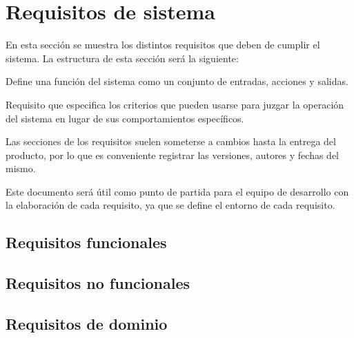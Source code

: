 \chapter{Requisitos de sistema}
    En esta secci\'on se muestra los distintos requisitos que deben de cumplir el sistema. La estructura de esta secci\'on ser\'a la siguiente:
    \begin{description}
        \item[Requisitos funcionales:]{Define una funci\'on del sistema como un conjunto de entradas, acciones y salidas.}
        \item[Requisitos no funcionales:]{Requisito que especifica los criterios que pueden usarse para juzgar la operaci\'on del sistema en lugar de sus comportamientos espec\'ificos.}
        \item
    \end{description}

    Las secciones de los requisitos suelen someterse a cambios hasta la entrega del producto, por lo que es conveniente registrar las versiones, autores y fechas del mismo.

    Este documento ser\'a \'util como punto de partida para el equipo de desarrollo con la elaboraci\'on de cada requisito, ya que se define el entorno de cada requisito.

\section{Requisitos funcionales}
	

\section{Requisitos no funcionales}
	

\section{Requisitos de dominio}
	

